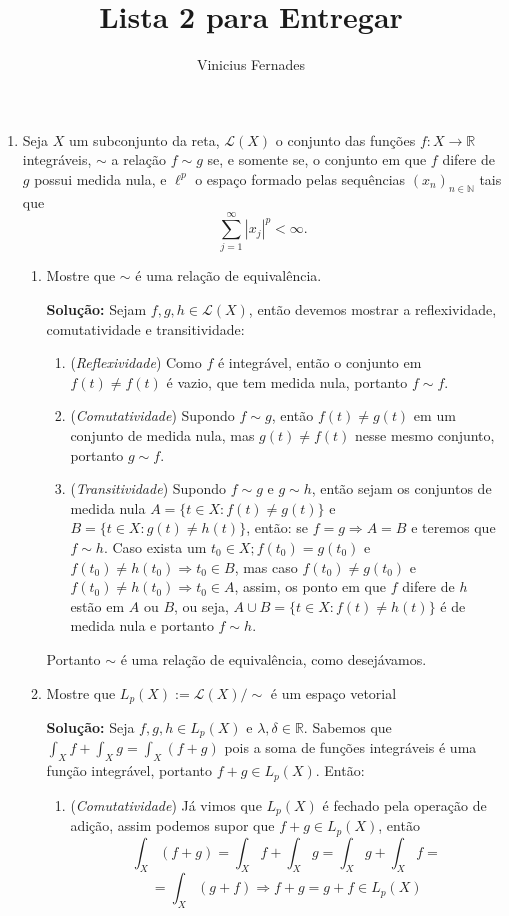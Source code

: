 \documentclass{article}
\begin{document}
	
	\title{Lista 2 para Entregar}
	\author{Vinicius Fernades}
	
	\maketitle
	
	\begin{enumerate}
		\item Seja $X$ um subconjunto da reta, $\mathcal{L}(X)$ o conjunto das funções $f:X \to \mathbb{R}$ integráveis, $\sim$ a relação $f \sim g$ se, e somente se, o conjunto em que $f$ difere de $g$ possui medida nula, e $\ell^{p}$ o espaço formado pelas sequências $(x_n)_{n \in \mathbb{N}}$ tais que
		$$
		\sum \limits_{j=1}^{\infty} |x_j|^{p} < \infty.
		$$
		\begin{enumerate}
			\item Mostre que $\sim$ é uma relação de equivalência.
			
			\textbf{Solução:} Sejam $f, g, h \in \mathcal{L}(X)$, então devemos mostrar a reflexividade, comutatividade e transitividade:
			\begin{enumerate}
				\item (\textit{Reflexividade}) Como $f$ é integrável, então o conjunto em $f(t) \neq f(t)$ é vazio, que tem medida nula, portanto $f \sim f$.
				
				\item (\textit{Comutatividade}) Supondo $f \sim g$, então $f(t) \neq g(t)$ em um conjunto de medida nula, mas $g(t) \neq f(t)$ nesse mesmo conjunto, portanto $g \sim f$. 
				
				\item (\textit{Transitividade}) Supondo $f \sim g$ e $g \sim h$, então sejam os conjuntos de medida nula $A=\{t \in X: f(t) \neq g(t)\}$ e $B=\{t \in X: g(t) \neq h(t)\}$, então: se $f = g \Rightarrow A=B$ e teremos que $f \sim h$. Caso exista um $t_0 \in X; f(t_0) = g(t_0)$ e $f(t_0) \neq h(t_0) \Rightarrow t_0 \in B$, mas caso  $f(t_0) \neq g(t_0)$ e $f(t_0) \neq h(t_0) \Rightarrow t_0 \in A$, assim, os ponto em que $f$ difere de $h$ estão em $A$ ou $B$, ou seja, $A\cup B=\{ t \in X: f(t) \neq h(t) \}$ é de medida nula e portanto $f \sim h$.  
			\end{enumerate}
			Portanto $\sim$ é uma relação de equivalência, como desejávamos. 
			
			
			\item Mostre que $L_{p}(X) := \mathcal{L}(X)/\sim$ é um espaço vetorial
			
			\textbf{Solução:} Seja $f, g, h \in L_{p}(X)$ e $\lambda, \delta \in \mathbb{R}$. Sabemos que $\int_{X}f  + \int_{X} g = \int_{X}(f+g)$ pois a soma de funções integráveis é uma função integrável, portanto $f+g \in L_{p}(X)$. Então:
				\begin{enumerate}
					\item (\textit{Comutatividade}) Já vimos que $L_{p}(X)$ é fechado pela operação de adição, assim podemos supor que $f +g \in L_{p}(X)$, então 
					$$
					\int_{X}(f+g) = \int_{X}f+ \int_{X}g =  \int_{X}g+ \int_{X}f =
					$$
					$$
					= \int_{X}(g+ f)  \Rightarrow f+g = g+f \in L_{p}(X)
					$$
					

\end{enumerate}
\end{enumerate}
\end{enumerate}
\end{document}
